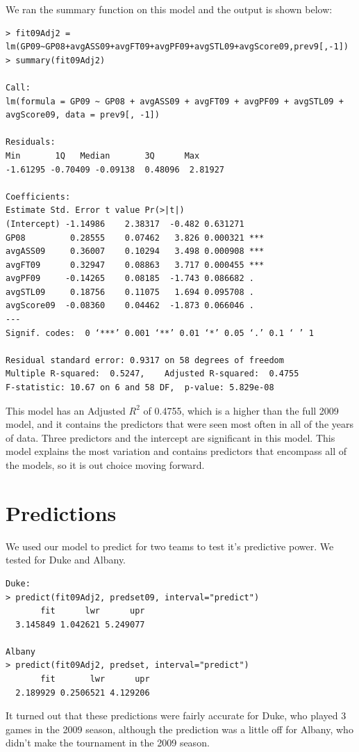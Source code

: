 \documentclass[]{scrartcl}
\begin{document}
We ran the summary function on this model and the output is shown below:
\footnotesize
\begin{verbatim}
> fit09Adj2 = lm(GP09~GP08+avgASS09+avgFT09+avgPF09+avgSTL09+avgScore09,prev9[,-1])
> summary(fit09Adj2)

Call:
lm(formula = GP09 ~ GP08 + avgASS09 + avgFT09 + avgPF09 + avgSTL09 + 
avgScore09, data = prev9[, -1])

Residuals:
Min       1Q   Median       3Q      Max 
-1.61295 -0.70409 -0.09138  0.48096  2.81927 

Coefficients:
Estimate Std. Error t value Pr(>|t|)    
(Intercept) -1.14986    2.38317  -0.482 0.631271    
GP08         0.28555    0.07462   3.826 0.000321 ***
avgASS09     0.36007    0.10294   3.498 0.000908 ***
avgFT09      0.32947    0.08863   3.717 0.000455 ***
avgPF09     -0.14265    0.08185  -1.743 0.086682 .  
avgSTL09     0.18756    0.11075   1.694 0.095708 .  
avgScore09  -0.08360    0.04462  -1.873 0.066046 .  
---
Signif. codes:  0 ‘***’ 0.001 ‘**’ 0.01 ‘*’ 0.05 ‘.’ 0.1 ‘ ’ 1

Residual standard error: 0.9317 on 58 degrees of freedom
Multiple R-squared:  0.5247,	Adjusted R-squared:  0.4755 
F-statistic: 10.67 on 6 and 58 DF,  p-value: 5.829e-08
\end{verbatim}
\normalsize
This model has an Adjusted $R^{2}$ of 0.4755, which is a higher than the full 2009 model, and it contains the predictors that were seen most often in all of the years of data. Three predictors and the intercept are significant in this model. This model explains the most variation and contains predictors that encompass all of the models, so it is out choice moving forward.
\section*{Predictions}
We used our model to predict for two teams to test it's predictive power. We tested for Duke and Albany.
\footnotesize
\begin{verbatim}
Duke:
> predict(fit09Adj2, predset09, interval="predict")
       fit      lwr      upr
  3.145849 1.042621 5.249077
  
Albany
> predict(fit09Adj2, predset, interval="predict")
       fit       lwr      upr
  2.189929 0.2506521 4.129206
\end{verbatim}
\normalsize
It turned out that these predictions were fairly accurate for Duke, who played 3 games in the 2009 season, although the prediction was a little off for Albany, who didn't make the tournament in the 2009 season.
\end{document}
